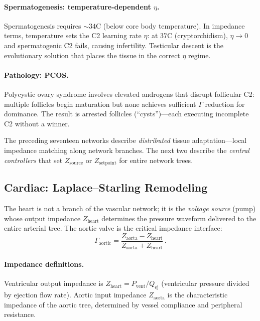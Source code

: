 \documentclass[aps,pre,twocolumn,superscriptaddress,floatfix]{revtex4-2}
\begin{document}
\paragraph{Spermatogenesis: temperature-dependent $\eta$.}
Spermatogenesis requires $\sim 34$\textdegree C
(below core body temperature).
In impedance terms, temperature sets the C2
learning rate $\eta$: at $37$\textdegree C
(cryptorchidism), $\eta \to 0$ and
spermatogenic C2 fails, causing infertility.
Testicular descent is the evolutionary solution
that places the tissue in the correct $\eta$ regime.

\paragraph{Pathology: PCOS.}
Polycystic ovary syndrome involves elevated
androgens that disrupt follicular C2: multiple
follicles begin maturation but none achieves
sufficient $\Gamma$ reduction for dominance.
The result is arrested follicles (``cysts'')---each
executing incomplete C2 without a winner.



\bigskip
\noindent
The preceding seventeen networks describe \emph{distributed}
tissue adaptation---local impedance matching along network
branches.  The next two describe the \emph{central
controllers} that set $Z_{\text{source}}$ or
$Z_{\text{setpoint}}$ for entire network trees.

\subsection{Cardiac: Laplace--Starling Remodeling}
\label{sec:cardiac}

The heart is not a branch of the vascular network; it is
the \emph{voltage source} (pump) whose output impedance
$Z_{\text{heart}}$ determines the pressure waveform
delivered to the entire arterial tree.
The aortic valve is the critical impedance interface:
\begin{equation}
  \Gamma_{\text{aortic}} =
  \frac{Z_{\text{aorta}} - Z_{\text{heart}}}
       {Z_{\text{aorta}} + Z_{\text{heart}}}\,.
  \label{eq:gamma-aortic}
\end{equation}

\paragraph{Impedance definitions.}
Ventricular output impedance is
$Z_{\text{heart}} = P_{\text{vent}} / Q_{\text{ej}}$
(ventricular pressure divided by ejection flow rate).
Aortic input impedance $Z_{\text{aorta}}$ is the
characteristic impedance of the aortic tree,
determined by vessel compliance and peripheral
resistance.
\end{document}
